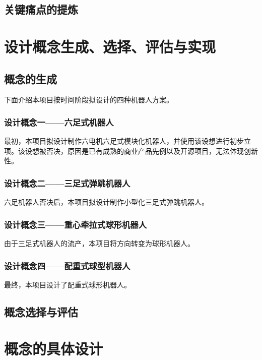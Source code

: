 \documentclass[a4paper]{ctexart}
\numberwithin{equation}{section}
\numberwithin{table}{section}
\numberwithin{figure}{section}
\begin{document}
\subsection{关键痛点的提炼}

\section{设计概念生成、选择、评估与实现}


\subsection{概念的生成}

下面介绍本项目按时间阶段拟设计的四种机器人方案。

\subsubsection{设计概念一——六足式机器人}

最初，本项目拟设计制作六电机六足式模块化机器人，并使用该设想进行初步立项。该设想被否决，原因是已有成熟的商业产品先例以及开源项目，无法体现创新性。


\subsubsection{设计概念二——三足式弹跳机器人}

六足机器人否决后，本项目拟设计制作小型化三足式弹跳机器人。


\subsubsection{设计概念三——重心牵拉式球形机器人}

由于三足式机器人的流产，本项目将方向转变为球形机器人。

\subsubsection{设计概念四——配重式球型机器人}

最终，本项目设计了配重式球形机器人。

\subsection{概念选择与评估}


\section{概念的具体设计}
\end{document}
